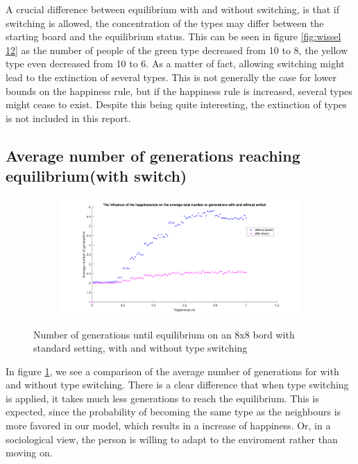 A crucial difference between equilibrium with and without switching, is that if switching is allowed, the concentration of the types may differ between the starting board and the equilibrium status. 
This can be seen in figure \ref{fig:wissel 12} as the number of people of the green type decreased from 10 to 8, the yellow type even decreased from 10 to 6. 
As a matter of fact, allowing switching might lead to the extinction of several types. 
This is not generally the case for lower bounds on the happiness rule, but if the happiness rule is increased, several types might cease to exist. Despite this being quite interesting, the extinction of types is not included in this report.\\
\subsection{Average number of generations reaching equilibrium(with switch)}
\begin{figure}[H]
	\centering
    \begin{subfigure}{0.9\textwidth}
        \includegraphics[width=\textwidth]{happinessrule-totaantgenwithswitchorwithoutswitch}
    \end{subfigure}
    \caption{Number of generations until equilibrium on an 8x8 bord with standard setting, with and without type switching}
    \label{fig:AantGenS}
\end{figure}
In figure \ref{fig:AantGenS}, we see a comparison of the average number of generations for with and without type switching. There is a clear difference that when type switching is applied, it takes much less generations to reach the equilibrium. This is expected, since the probability of becoming the same type as the neighbours is more favored in our model, which results in a increase of happiness. Or, in a sociological view, the person is willing to adapt to the enviroment rather than moving on.\\
